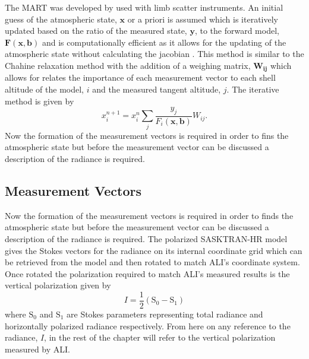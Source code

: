 The MART was developed by \citep{Bourassa2012a} used with limb scatter instruments. An initial guess of the atmospheric state, $\mathbf{x}$ or a priori is assumed which is iteratively updated based on the ratio of the measured state, $\mathbf{y}$, to the forward model, $\mathbf{F}(\mathbf{x},\mathbf{b})$ and is computationally efficient as it allows for the updating of the atmospheric state without calculating the jacobian \cite{Degenstein2009}. This method is similar to the Chahine relaxation method \citep{Chahine1972} with the addition of a weighing matrix, $\mathbf{W_{ij}}$ which allows for relates the importance of each measurement vector to each shell altitude of the model, $i$ and the measured tangent altitude, $j$. The iterative method is given by
\begin{equation}
    x_{i}^{n+1} = x_{i}^{n}\sum_{j}\frac{y_{j}}{F_{i}(\mathbf{x},\mathbf{b})}W_{ij}.
\end{equation}
Now the formation of the measurement vectors is required in order to fins the atmospheric state but before the measurement vector can be discussed a description of the radiance is required.

\subsection{Measurement Vectors}

Now the formation of the measurement vectors is required in order to finds the atmospheric state but before the measurement vector can be discussed a description of the radiance is required. The polarized SASKTRAN-HR model gives the Stokes vectors for the radiance on its internal coordinate grid which can be retrieved from the model and then rotated to match ALI's coordinate system. Once rotated the polarization required to match ALI's measured results is the vertical polarization given by
\begin{equation}
    I = \frac{1}{2}\left(\mathrm{S_{0}}-\mathrm{S_{1}}\right)
\end{equation}
where $\mathrm{S_{0}}$ and $\mathrm{S_{1}}$ are Stokes parameters representing total radiance and horizontally polarized radiance respectively. From here on any reference to the radiance, $I$, in the rest of the chapter will refer to the vertical polarization measured by ALI.

